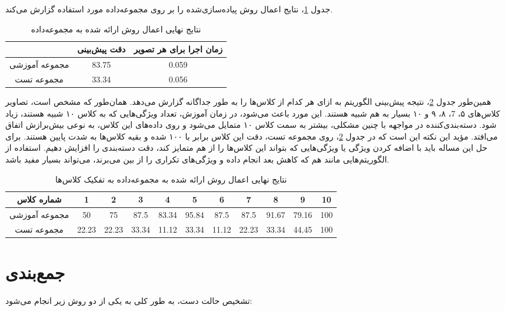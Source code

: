 \documentclass[11.5pt,a4paper]{article}
\begin{document}
جدول \ref{tbl:res}، نتایج اعمال روش پیاده‌سازی‌شده را بر روی مجموعه‌داده مورد استفاده گزارش می‌کند. 

\begin{table}[h]
\center
\caption{نتایج نهایی اعمال روش ارائه شده به مجموعه‌داده}
\label{tbl:res}
\begin{tabular}{c | c | c }
& دقت پیش‌بینی & زمان اجرا برای هر تصویر
\\
\hline
\hline
مجموعه آموزشی& 83.75 & 0.059
\\
مجموعه تست& 33.34& 0.056
\end{tabular}
\end{table}

 همین‌طور جدول \ref{tbl:resdet}، نتیجه پیش‌بینی الگوریتم به ازای هر کدام از کلاس‌ها را به طور جداگانه گزارش 
 می‌دهد. همان‌طور که مشخص است، تصاویر کلاس‌های ۵، 7، ۸، ۹ و ۱۰ بسیار به هم شبیه هستند. این مورد باعث می‌شود،  در زمان آموزش، تعداد ویژگی‌هایی که به کلاس ۱۰ شبیه هستند، زیاد شود. دسته‌بندی‌کننده در مواجهه با چنین مشکلی، بیشتر به سمت کلاس ۱۰ متمایل می‌شود و روی داده‌های این کلاس، به نوعی بیش‌برازش اتفاق می‌افتد. مؤید این نکته این است که در جدول \ref{tbl:resdet}، روی مجموعه‌ تست، دقت این کلاس برابر با ۱۰۰ شده و بقیه کلاس‌ها به شدت پایین هستند. برای حل این مساله باید با اضافه کردن ویژگی یا ویژگی‌هایی که بتواند این کلاس‌ها را از هم متمایز کند، دقت دسته‌بندی را افزایش دهیم. استفاده از الگوریتم‌هایی مانند  هم که کاهش بعد انجام داده و ویژگی‌های تکراری را از بین می‌برند، می‌تواند بسیار مفید باشد.


\begin{table}[h]
\center
\caption{نتایج نهایی اعمال روش ارائه شده به مجموعه‌داده به تفکیک کلاس‌ها}
\label{tbl:resdet}
\begin{tabular}{c | c | c | c | c | c | c | c | c | c | c}
شماره کلاس & 1 & 2 &3 & 4 & 5 & 6 & 7 & 8 & 9 & 10
\\
\hline
\hline
مجموعه آموزشی& 50 & 75 & 87.5 & 83.34 & 95.84 & 87.5 & 87.5 & 91.67 & 79.16 & 100
\\
مجموعه تست  & 22.23 & 22.23 & 33.34 & 11.12 & 33.34 & 11.12 & 22.23 & 33.34 & 44.45 & 100
\end{tabular}
\end{table}
 
 
\section{ جمع‌بندی}

تشخیص حالت دست، به طور کلی به یکی از دو روش زیر انجام می‌شود:
\end{document}
